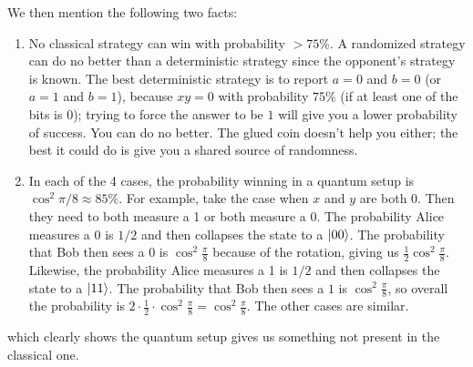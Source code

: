 We then mention the following two facts:
\begin{enumerate}
\item No classical strategy can win with probability $> 75\%$. A randomized strategy can do no better than a deterministic strategy since the opponent's strategy is known.
The best deterministic strategy is to report $a = 0$ and $b = 0$ (or $a = 1$ and $b = 1$), because $xy = 0$ with probability $75\%$ (if at least one of the bits is 0); trying to force the answer to be $1$ will give you a lower probability of success.
You can do no better. The glued coin doesn't help you either; the best it could do is give you a shared source of randomness.
\item In each of the 4 cases, the probability winning in a quantum setup is $\cos^2 \pi/8 \approx 85\%$. For example, take the case
when $x$ and $y$ are both 0. Then they need to both measure a 1 or both measure a 0. The probability Alice measures a 0 is $1/2$ and then collapses the state to 
a $\ket{00}$. The probability that Bob then sees a $0$ is $\cos^2 \frac{\pi}{8}$ because of the rotation, giving us $\frac{1}{2} \cos^2 \frac{\pi}{8}$. Likewise, the probability Alice measures a 1 is $1/2$ and then
collapses the state to a $\ket{11}$. The probability that Bob then sees a $1$ is $\cos^2 \frac{\pi}{8}$, so overall the probability is $2 \cdot \frac{1}{2} \cdot \cos^2 \frac{\pi}{8} = \cos^2 \frac{\pi}{8}$.
The other cases are similar.
\end{enumerate}

which clearly shows the quantum setup gives us something not present in the classical one.
